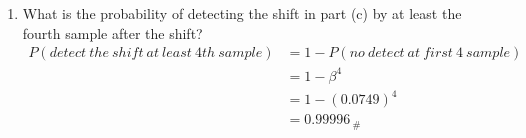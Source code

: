 \begin{enumerate}
    \item What is the probability of detecting the shift in part (c) by at least the fourth sample after the shift?
        \begin{align*}
            P\left(detect \ the \ shift \ at \ least \ 4th \ sample \right) &= 1 - P\left(no \ detect \ at \ first \ 4 \ sample \right)\\
            &= 1 - \beta^4\\
            &= 1 - (0.0749)^4\\
            &= 0.99996_{\ \#}
        \end{align*}
        
\end{enumerate}